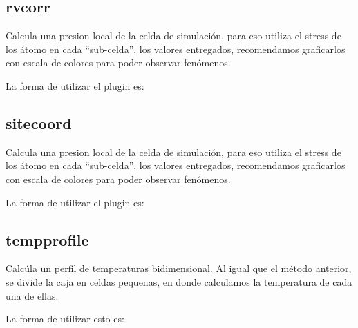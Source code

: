 \subsection{rvcorr}

Calcula una presion local de la celda de simulaci\'on, para eso utiliza el stress de los \'atomo en cada ``sub-celda'', los valores entregados, recomendamos graficarlos con escala de colores para poder observar fen\'omenos. 

La forma de utilizar el plugin es:

\subsection{sitecoord}

Calcula una presion local de la celda de simulaci\'on, para eso utiliza el stress de los \'atomo en cada ``sub-celda'', los valores entregados, recomendamos graficarlos con escala de colores para poder observar fen\'omenos. 

La forma de utilizar el plugin es:


\subsection{tempprofile}
Calc\'ula un perfil de temperaturas bidimensional. Al igual que el m\'etodo anterior, se divide la caja en celdas pequenas, en donde calculamos la temperatura de cada una de ellas.

La forma de utilizar esto es:


